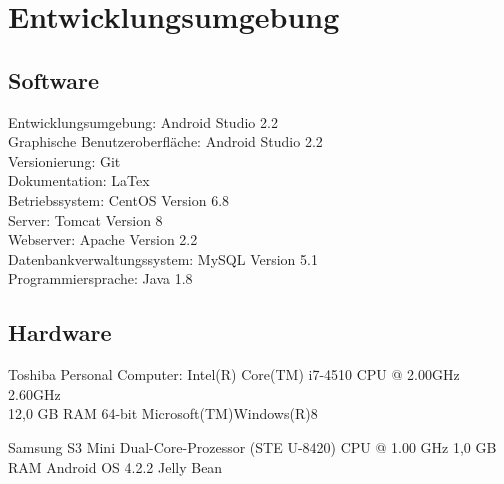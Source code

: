 \section{Entwicklungsumgebung}

\subsection{Software}
Entwicklungsumgebung: 			Android Studio 2.2\\
Graphische Benutzeroberfläche: 	Android Studio 2.2\\
Versionierung: 					Git\\
Dokumentation:					LaTex\\
Betriebssystem: 				CentOS Version 6.8\\
Server:							Tomcat Version 8\\
Webserver:						Apache Version 2.2\\
Datenbankverwaltungssystem: 	MySQL Version 5.1\\
Programmiersprache:				Java 1.8\\

\subsection{Hardware}

Toshiba Personal Computer:		Intel(R) Core(TM) i7-4510 CPU @ 2.00GHz 2.60GHz\\
								12,0 GB RAM
								64-bit Microsoft(TM)Windows(R)8
								
Samsung S3 Mini					Dual-Core-Prozessor (STE U-8420) CPU @ 1.00 GHz
								1,0 GB RAM
								Android OS 4.2.2 Jelly Bean\\
